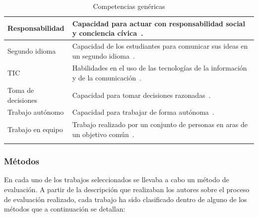 \begin{landscape}
\begin{center}
\begin{longtable}{| m{6cm} | m{16cm} |}
    \hline
    Responsabilidad & Capacidad para actuar con responsabilidad social y conciencia cívica~\cite{gonzalez2003tuning}. \\
    \hline 
    Segundo idioma & Capacidad de los estudiantes para comunicar sus ideas en un segundo idioma~\cite{gass2013second}. \\
    \hline
    TIC & Habilidades en el uso de las tecnologías de la información y de la comunicación~\cite{gonzalez2003tuning}. \\
    \hline
    Toma de decisiones & Capacidad para tomar decisiones razonadas~\cite{gonzalez2003tuning}. \\
    \hline
    Trabajo autónomo & Capacidad para trabajar de forma autónoma~\cite{gonzalez2003tuning}. \\
    \hline
    Trabajo en equipo & Trabajo realizado por un conjunto de personas en aras de un objetivo común~\cite{parker1990teamwork}. \\
    \hline
\caption{Competencias genéricas}
\label{tab:CompetenciasGenericas}
\end{longtable} 
\end{center}
\end{landscape}
\pagestyle{fancy}

\subsubsection{Métodos}

En cada uno de los trabajos seleccionados se llevaba a cabo un método de evaluación. A partir de la descripción que realizaban los autores sobre el proceso de evaluación realizado, cada trabajo ha sido clasificado dentro de alguno de los métodos que a continuación se detallan:

